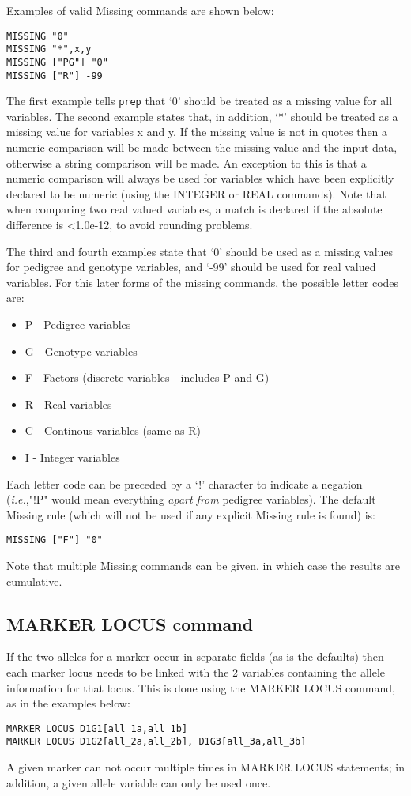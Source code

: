 \documentclass[10pt,a4paper]{article}
\newcommand{\IE}{\textit{i.e.},\xspace}
\newcommand{\Prep}{\texttt{prep}\xspace}
\begin{document}
Examples of valid Missing commands are shown below:
\begin{verbatim}
MISSING "0"  
MISSING "*",x,y
MISSING ["PG"] "0"
MISSING ["R"] -99
\end{verbatim}
The first example tells \Prep that `0' should be treated as a missing value
for all variables.  The second example states that, in addition, `*' should
be treated as a missing value for variables x and y.  If the missing value
is not in quotes then a numeric comparison will be made between the missing
value and the input data, otherwise a string comparison will be made.  An
exception to this is that a numeric comparison will always be used for variables 
which have been explicitly declared to be numeric (using the INTEGER or REAL
commands).  Note that when comparing two real valued variables, a match is
declared if the absolute difference is <1.0e-12, to avoid rounding problems.

The third and fourth examples state that `0' should be used as a missing
values for pedigree and genotype variables, and `-99' should be used for
real valued variables.  For this later forms of the missing commands, the
possible letter codes are:
\begin{itemize}
\item P - Pedigree variables
\item G - Genotype variables
\item F - Factors (discrete variables - includes P and G)
\item R - Real variables
\item C - Continous variables (same as R)
\item I - Integer variables
\end{itemize}
Each letter code can be preceded by a `!' character to indicate a negation
(\IE "!P" would mean everything \emph{apart from} pedigree variables).  The
default Missing rule (which will not be used if any explicit Missing rule is
found) is:
\begin{verbatim}
MISSING ["F"] "0"
\end{verbatim}
Note that multiple Missing commands can be given, in which case the results
are cumulative.
\subsection{MARKER LOCUS command}
If the two alleles for a marker occur in separate fields (as is the
defaults) then
each marker locus needs to be linked with the 2 variables containing the allele
information for that locus.  This is done using the MARKER LOCUS command, as
in the examples below:
\begin{verbatim}
MARKER LOCUS D1G1[all_1a,all_1b]  
MARKER LOCUS D1G2[all_2a,all_2b], D1G3[all_3a,all_3b]  
\end{verbatim}
A given marker can not occur multiple times in MARKER LOCUS statements; in
addition, a given allele variable can only be used once.
\end{document}

